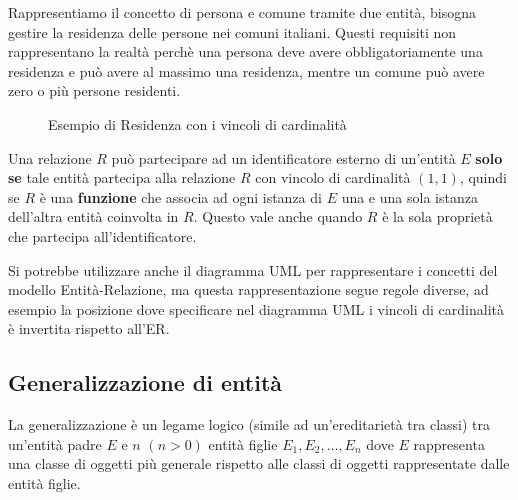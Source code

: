 \documentclass[a4paper,twoside]{article}
\begin{document}
\begin{example}
  Rappresentiamo il concetto di persona e comune tramite due entità, bisogna gestire
  la residenza delle persone nei comuni italiani. Questi requisiti non rappresentano
  la realtà perchè una persona deve avere obbligatoriamente una residenza e può avere
  al massimo una residenza, mentre un comune può avere zero o più persone residenti.
  \begin{figure}[H]
    \centering
    \caption{Esempio di Residenza con i vincoli di cardinalità}
  \end{figure}
\end{example}

\begin{definition}
  Una relazione \( R \) può partecipare ad un identificatore esterno di un'entità \( E \)
  \textbf{solo se} tale entità partecipa alla relazione \( R \) con vincolo di
  cardinalità \( (1, 1) \), quindi se \( R \) è una \textbf{funzione} che associa ad
  ogni istanza di \( E \) una e una sola istanza dell'altra entità coinvolta in \( R \).
  Questo vale anche quando \( R \) è la sola proprietà che partecipa all'identificatore.
\end{definition}

\vspace{1em}
\noindent
Si potrebbe utilizzare anche il diagramma UML per rappresentare i concetti del modello
Entità-Relazione, ma questa rappresentazione segue regole diverse, ad esempio la
posizione dove specificare nel diagramma UML i vincoli di cardinalità è invertita rispetto
all'ER.

\subsection{Generalizzazione di entità}
La generalizzazione è un legame logico (simile ad un'ereditarietà tra classi) tra un'entità
padre \( E \) e \( n \) \( (n > 0) \) entità figlie \( E_1, E_2, \ldots, E_n \) dove
\( E \) rappresenta una classe di oggetti più generale rispetto alle classi di oggetti
rappresentate dalle entità figlie.
\end{document}
